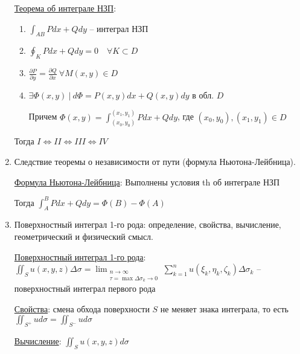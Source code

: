 \documentclass[12pt]{article}
\begin{document}
\begin{enumerate}
        \hyperlink{theorempathindependentintegrals}{Теорема об интеграле НЗП}:

        \begin{enumerate}[label=\Roman*.]

        \item $\int_{AB} Pdx + Qdy$ -- интеграл НЗП

        \item $\oint_K Pdx + Qdy = 0 \quad \forall K \subset D$

        \item $\frac{\partial P}{\partial y} = \frac{\partial Q}{\partial x} \ \forall M(x, y) \in D$

        \item $\exists \Phi(x, y) \ | \ d\Phi = P(x, y)dx + Q(x, y)dy$ в обл. $D$

        Причем $\Phi(x, y) = \int_{(x_0,y_0)}^{(x_1,y_1)}Pdx+Qdy$, где $(x_0, y_0), (x_1,y_1) \in D$

        \end{enumerate}

        Тогда $I \Longleftrightarrow II \Longleftrightarrow III \Longleftrightarrow IV$

        \item Следствие теоремы о независимости от пути (формула Ньютона-Лейбница).

        \hyperlink{theoremNewtonLeibnizforpathindependantintegral}{Формула Ньютона-Лейбница}:
        Выполнены условия th об интеграле НЗП

        Тогда $\int_A^B Pdx + Qdy = \Phi(B) - \Phi(A)$

        \item Поверхностный интеграл 1-го рода: определение, свойства, вычисление, геометрический и физический смысл.

        \hyperlink{surfaceintegraloffirstkind}{Поверхностный интеграл 1-го рода}:
        $\iint_S u(x, y, z) \Delta \sigma = \lim_{\substack{n \to \infty \\ \tau = \max \Delta \sigma_k \to 0}} \sum_{k = 1}^{n} u(\xi_k, \eta_k, \zeta_k) \Delta \sigma_k$ -- поверхностный интеграл первого рода

        \hyperlink{surfaceintegraloffirstkindproperties}{Свойства}: смена обхода поверхности $S$ не меняет знака интеграла, то есть $\iint_{S^+} u d\sigma = \iint_{S^-} u d\sigma$

        \hyperlink{surfaceintegraloffirstkindcalculation}{Вычисление}: $\iint_S u(x, y, z) d\sigma$


\end{enumerate}
\end{document}
